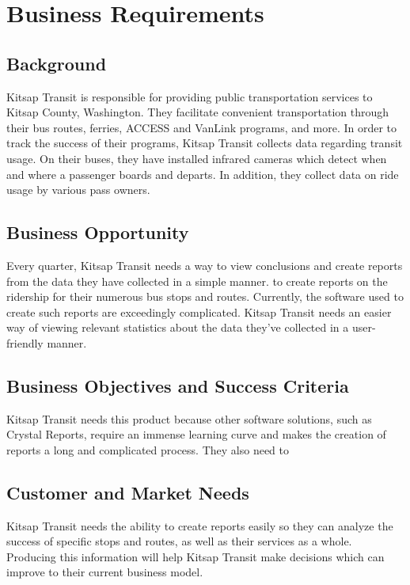 \section{Business Requirements}
\subsection{Background}
Kitsap Transit is responsible for providing public transportation services to Kitsap County, Washington. They facilitate convenient transportation through their bus routes, ferries, ACCESS and VanLink programs, and more. In order to track the success of their programs, Kitsap Transit collects data regarding transit usage. On their buses, they have installed infrared cameras which detect when and where a passenger boards and departs. In addition, they collect data on ride usage by various pass owners.
\raggedbottom
\subsection{Business Opportunity}
Every quarter, Kitsap Transit needs a way to view conclusions and create reports from the data they have collected in a simple manner. to create reports on the ridership for their numerous bus stops and routes. Currently, the software used to create such reports are exceedingly complicated. Kitsap Transit needs an easier way of viewing relevant statistics about the data they've collected in a user-friendly manner.
\raggedbottom
\subsection{Business Objectives and Success Criteria}
Kitsap Transit needs this product because other software solutions, such as Crystal Reports, require an immense learning curve and makes the creation of reports a long and complicated process. They also need to 
\raggedbottom
\subsection{Customer and Market Needs}
Kitsap Transit needs the ability to create reports easily so they can analyze the success of specific stops and routes, as well as their services as a whole. Producing this information will help Kitsap Transit make decisions which can improve to their current business model. \\

